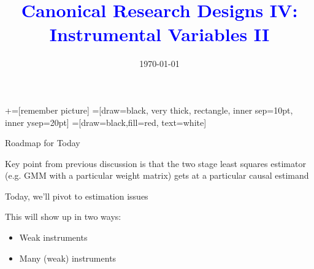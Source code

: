 \documentclass[notes,11pt, aspectratio=169]{beamer}
\title[]{\textcolor{blue}{Canonical Research Designs IV:\\ Instrumental Variables II }}
\author[PGP]{}
\institute[FRBNY]{\small{\begin{tabular}{c}
  Paul Goldsmith-Pinkham  \\
\end{tabular}}}
\date{\today}
\newenvironment{wideitemize}{\itemize\addtolength{\itemsep}{10pt}}{\enditemize}
\begin{document}
\newcommand\marktopleft[1]{%
    \tikz[overlay,remember picture] 
        \node (marker-#1-a) at (-.3em,.3em) {};%
}
\newcommand\markbottomright[2]{%
    \tikz[overlay,remember picture] 
        \node (marker-#1-b) at (0em,0em) {};%
}
+=[remember picture] 
 =[draw=black, very thick, rectangle, inner sep=10pt, inner ysep=20pt]
 =[draw=black,fill=red, text=white]

\begin{frame}
\maketitle
\end{frame}

\begin{frame}{Roadmap for Today}
  \begin{wideitemize}
    \item Key point from previous discussion is that the two stage
      least squares estimator (e.g. GMM with a particular weight
      matrix) gets at a particular causal estimand
    \item Today, we'll pivot to estimation issues
    \item This will show up in two ways:
      \begin{itemize}
      \item Weak instruments
      \item Many (weak) instruments
      \end{itemize}
  \end{wideitemize}
\end{frame}
\end{document}
